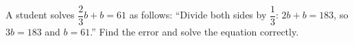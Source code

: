 A student solves $\dfrac{2}{3}b+b=61$ as follows: ``Divide both sides by $\dfrac{1}{3}$: $2b+b=183$, so $3b=183$ and $b=61$.'' Find the error and solve the equation correctly.
